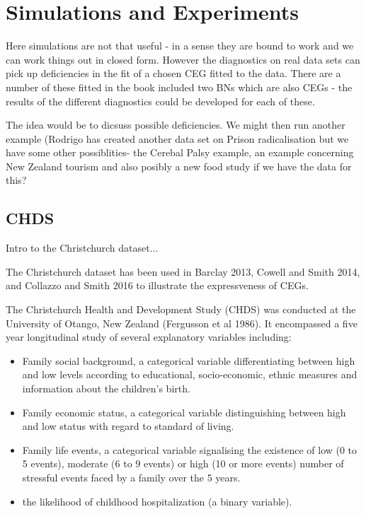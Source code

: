 \documentclass[12pt]{article}
\begin{document}
\section{Simulations and Experiments}

Here simulations are not that useful - in a sense they are bound to work and
we can work things out in closed form. However the diagnostics on real data
sets can pick up deficiencies in the fit of a chosen CEG fitted to the data.
There are a number of these fitted in the book included two BNs which are
also CEGs - the results of the different diagnostics could be developed for
each of these. 

The idea would be to dicsuss possible deficiencies. We might
then run another example (Rodrigo has created another data set on Prison
radicalisation but we have some other possiblities- the Cerebal Palsy
example, an example concerning New Zealand tourism and also posibly a new
food study if we have the data for this? 


\subsection{CHDS}

Intro to the Christchurch dataset...

The Christchurch dataset has been used in Barclay 2013, Cowell and Smith 2014, and Collazzo and Smith 2016 to illustrate the expressveness of CEGs. 

The Christchurch Health and Development Study (CHDS) was conducted at the University of Otango, New Zealand (Fergusson et al 1986). It encompassed a five year longitudinal study of several explanatory variables including: 
\begin{itemize}
	\item Family social background, a categorical variable differentiating between high and low levels according to educational, socio-economic, ethnic measures and information about the children’s birth.
	\item Family economic status, a categorical variable distinguishing between high and
	low status with regard to standard of living.
	\item Family life events, a categorical variable signalising the existence of low (0 to 5 events), moderate (6 to 9 events) or high (10 or more events) number of stressful events faced by a family over the 5 years.
	\item the likelihood of childhood hospitalization (a binary variable). 
\end{itemize}
\end{document}
